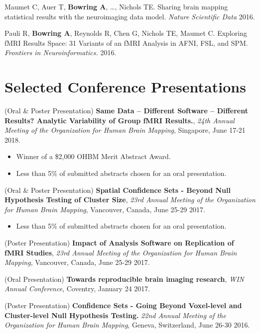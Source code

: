 \documentclass[a4paper,10pt]{article}
\begin{document}
Maumet C, Auer T, \textbf{Bowring A}, \dots, Nichols TE. Sharing brain mapping statistical results with the neuroimaging data model. \textit{Nature Scientific Data} 2016.

Pauli R, \textbf{Bowring A}, Reynolds R, Chen G, Nichols TE, Maumet C. Exploring fMRI Results Space: 31 Variants of an fMRI Analysis in AFNI, FSL, and SPM. \textit{Frontiers in Neuroinformatics.} 2016.\\

\section{Selected Conference Presentations}
(Oral \& Poster Presentation) \textbf{Same Data – Different Software – Different Results? Analytic Variability of Group fMRI Results.}, \textit{24th Annual Meeting of the Organization for Human Brain Mapping}, Singapore, June 17-21 2018. 
\vspace{-2mm}
\begin{itemize}
\item Winner of a \$2,000 OHBM Merit Abstract Award.
\vspace{-2mm}
\item Less than 5\% of submitted abstracts chosen for an oral presentation. 
\end{itemize}

(Oral \& Poster Presentation) \textbf{Spatial Confidence Sets - Beyond Null Hypothesis Testing of Cluster Size}, \textit{23rd Annual Meeting of the Organization for Human Brain Mapping}, Vancouver, Canada, June 25-29 2017.
\vspace{-2mm}
\begin{itemize}
\item Less than 5\% of submitted abstracts chosen for an oral presentation. 
\end{itemize}

(Poster Presentation) \textbf{Impact of Analysis Software on Replication of fMRI Studies}, \textit{23rd Annual Meeting of the Organization for Human Brain Mapping}, Vancouver, Canada, June 25-29 2017.

(Oral Presentation) \textbf{Towards reproducible brain imaging research}, \textit{WIN Annual Conference}, Coventry, January 24 2017.

(Poster Presentation) \textbf{Confidence Sets - Going Beyond Voxel-level and Cluster-level Null Hypothesis Testing.} \textit{22nd Annual Meeting of the Organization for Human Brain Mapping}, Geneva, Switzerland, June 26-30 2016. 
\end{document}
